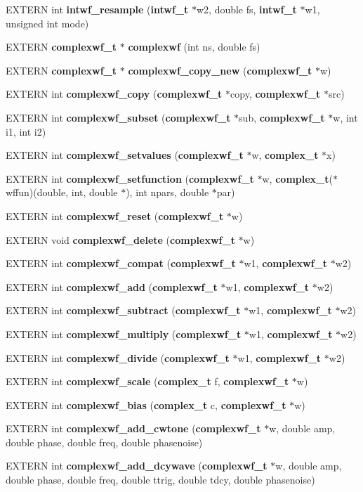 \begin{CompactItemize}
\item 
EXTERN int {\bf intwf\_\-resample} ({\bf intwf\_\-t} $\ast$w2, double fs, {\bf intwf\_\-t} $\ast$w1, unsigned int mode)
\item 
EXTERN {\bf complexwf\_\-t} $\ast$ {\bf complexwf} (int ns, double fs)
\item 
EXTERN {\bf complexwf\_\-t} $\ast$ {\bf complexwf\_\-copy\_\-new} ({\bf complexwf\_\-t} $\ast$w)
\item 
EXTERN int {\bf complexwf\_\-copy} ({\bf complexwf\_\-t} $\ast$copy, {\bf complexwf\_\-t} $\ast$src)
\item 
EXTERN int {\bf complexwf\_\-subset} ({\bf complexwf\_\-t} $\ast$sub, {\bf complexwf\_\-t} $\ast$w, int i1, int i2)
\item 
EXTERN int {\bf complexwf\_\-setvalues} ({\bf complexwf\_\-t} $\ast$w, {\bf complex\_\-t} $\ast$x)
\item 
EXTERN int {\bf complexwf\_\-setfunction} ({\bf complexwf\_\-t} $\ast$w, {\bf complex\_\-t}($\ast$wffun)(double, int, double $\ast$), int npars, double $\ast$par)
\item 
EXTERN int {\bf complexwf\_\-reset} ({\bf complexwf\_\-t} $\ast$w)
\item 
EXTERN void {\bf complexwf\_\-delete} ({\bf complexwf\_\-t} $\ast$w)
\item 
EXTERN int {\bf complexwf\_\-compat} ({\bf complexwf\_\-t} $\ast$w1, {\bf complexwf\_\-t} $\ast$w2)
\item 
EXTERN int {\bf complexwf\_\-add} ({\bf complexwf\_\-t} $\ast$w1, {\bf complexwf\_\-t} $\ast$w2)
\item 
EXTERN int {\bf complexwf\_\-subtract} ({\bf complexwf\_\-t} $\ast$w1, {\bf complexwf\_\-t} $\ast$w2)
\item 
EXTERN int {\bf complexwf\_\-multiply} ({\bf complexwf\_\-t} $\ast$w1, {\bf complexwf\_\-t} $\ast$w2)
\item 
EXTERN int {\bf complexwf\_\-divide} ({\bf complexwf\_\-t} $\ast$w1, {\bf complexwf\_\-t} $\ast$w2)
\item 
EXTERN int {\bf complexwf\_\-scale} ({\bf complex\_\-t} f, {\bf complexwf\_\-t} $\ast$w)
\item 
EXTERN int {\bf complexwf\_\-bias} ({\bf complex\_\-t} c, {\bf complexwf\_\-t} $\ast$w)
\item 
EXTERN int {\bf complexwf\_\-add\_\-cwtone} ({\bf complexwf\_\-t} $\ast$w, double amp, double phase, double freq, double phasenoise)
\item 
EXTERN int {\bf complexwf\_\-add\_\-dcywave} ({\bf complexwf\_\-t} $\ast$w, double amp, double phase, double freq, double ttrig, double tdcy, double phasenoise)

\end{CompactItemize}
